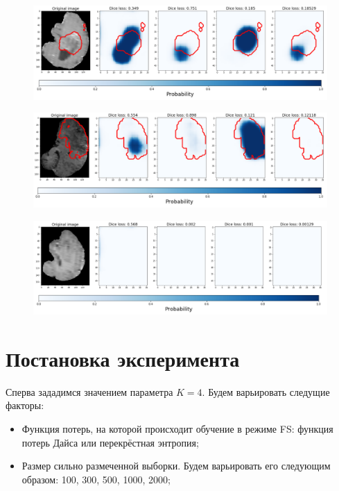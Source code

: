 \begin{figure}[h!] 
  \center
  \includegraphics [scale=0.64] {images/series_dice_4.png}

\end{figure}

\begin{figure}[h!] 
  \center
  \includegraphics [scale=0.64] {images/series_dice_5.png}

\end{figure}


\begin{figure}[h!] 
  \center
  \includegraphics [scale=0.64] {images/series_dice_6.png}

\end{figure}

\newpage
\section{Постановка эксперимента}

Сперва зададимся значением параметра $K = 4$. Будем варьировать следущие факторы:

\begin{itemize}
    \item Функция потерь, на которой происходит обучение в режиме FS: функция потерь Дайса или перекрёстная энтропия;
    \item Размер сильно размеченной выборки. Будем варьировать его следующим образом: 100, 300, 500, 1000, 2000; 
\end{itemize}

